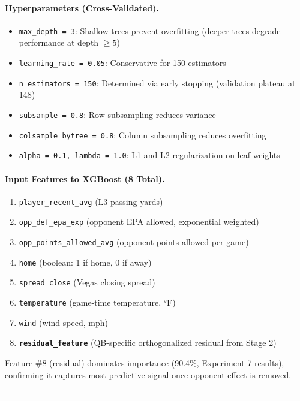 \paragraph{Hyperparameters (Cross-Validated).}
\begin{itemize}[itemsep=2pt,parsep=0pt]
    \item \texttt{max\_depth = 3}: Shallow trees prevent overfitting (deeper trees degrade performance at depth $\geq 5$)
    \item \texttt{learning\_rate = 0.05}: Conservative for 150 estimators
    \item \texttt{n\_estimators = 150}: Determined via early stopping (validation plateau at 148)
    \item \texttt{subsample = 0.8}: Row subsampling reduces variance
    \item \texttt{colsample\_bytree = 0.8}: Column subsampling reduces overfitting
    \item \texttt{alpha = 0.1, lambda = 1.0}: L1 and L2 regularization on leaf weights
\end{itemize}

\paragraph{Input Features to XGBoost (8 Total).}
\begin{enumerate}[itemsep=2pt,parsep=0pt]
    \item \texttt{player\_recent\_avg} (L3 passing yards)
    \item \texttt{opp\_def\_epa\_exp} (opponent EPA allowed, exponential weighted)
    \item \texttt{opp\_points\_allowed\_avg} (opponent points allowed per game)
    \item \texttt{home} (boolean: 1 if home, 0 if away)
    \item \texttt{spread\_close} (Vegas closing spread)
    \item \texttt{temperature} (game-time temperature, °F)
    \item \texttt{wind} (wind speed, mph)
    \item \textbf{\texttt{residual\_feature}} (QB-specific orthogonalized residual from Stage 2)
\end{enumerate}

Feature \#8 (residual) dominates importance (90.4\%, Experiment 7 results), confirming it captures most predictive signal once opponent effect is removed.

---

